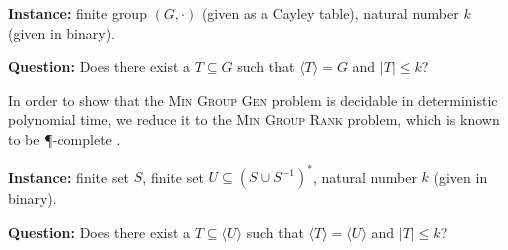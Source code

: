 \documentclass{article}
\newcommand{\gen}[1]{{\langle #1 \rangle}}
\begin{document}




\begin{definition}
  \mbox{}

  \textbf{Instance:} finite group $(G, \cdot)$ (given as a Cayley table), natural number $k$ (given in binary).

  \textbf{Question:} Does there exist a $T \subseteq G$ such that $\gen{T} = G$ and $|T| \leq k$?
\end{definition}

In order to show that the \textsc{Min Group Gen} problem is decidable in deterministic polynomial time, we reduce it to the \textsc{Min Group Rank} problem, which is known to be \P-complete \cite[Problem~A.8.11]{ghr95}.





\begin{definition}
  \mbox{}

  \textbf{Instance:} finite set $S$, finite set $U \subseteq (S \cup S^{-1})^*$, natural number $k$ (given in binary).

  \textbf{Question:} Does there exist a $T \subseteq \gen{U}$ such that $\gen{T} = \gen{U}$ and $|T| \leq k$?
\end{definition}
\end{document}
